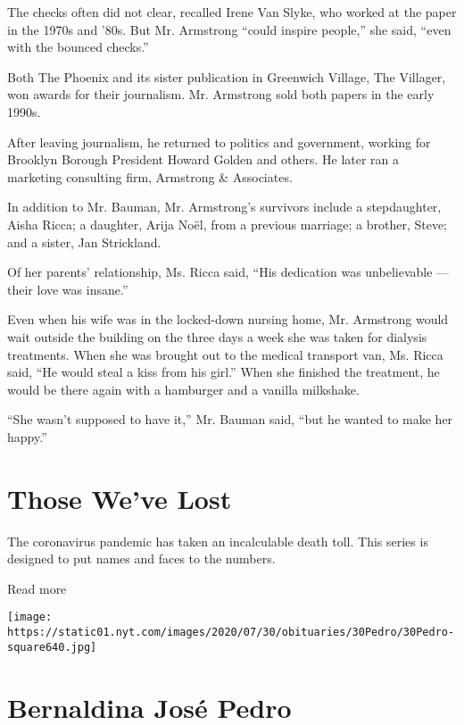 The checks often did not clear, recalled Irene Van Slyke, who worked at
the paper in the 1970s and '80s. But Mr. Armstrong ``could inspire
people,'' she said, ``even with the bounced checks.''

Both The Phoenix and its sister publication in Greenwich Village, The
Villager, won awards for their journalism. Mr. Armstrong sold both
papers in the early 1990s.

After leaving journalism, he returned to politics and government,
working for Brooklyn Borough President Howard Golden and others. He
later ran a marketing consulting firm, Armstrong \& Associates.

In addition to Mr. Bauman, Mr. Armstrong's survivors include a
stepdaughter, Aisha Ricca; a daughter, Arija Noël, from a previous
marriage; a brother, Steve; and a sister, Jan Strickland.

Of her parents' relationship, Ms. Ricca said, ``His dedication was
unbelievable --- their love was insane.''

Even when his wife was in the locked-down nursing home, Mr. Armstrong
would wait outside the building on the three days a week she was taken
for dialysis treatments. When she was brought out to the medical
transport van, Ms. Ricca said, ``He would steal a kiss from his girl.''
When she finished the treatment, he would be there again with a
hamburger and a vanilla milkshake.

``She wasn't supposed to have it,'' Mr. Bauman said, ``but he wanted to
make her happy.''

\href{https://www.nytimes.com/interactive/2020/obituaries/people-died-coronavirus-obituaries.html?action=click\&pgtype=Article\&state=default\&region=BELOW_MAIN_CONTENT\&context=covid_obits_promo}{}

\hypertarget{those-weve-lost}{%
\section{Those We've Lost}\label{those-weve-lost}}

The coronavirus pandemic has taken an incalculable death toll. This
series is designed to put names and faces to the numbers.

Read more

\texttt{[image: https://static01.nyt.com/images/2020/07/30/obituaries/30Pedro/30Pedro-square640.jpg]}

\hypertarget{bernaldina-josuxe9-pedro}{%
\section{Bernaldina José Pedro}\label{bernaldina-josuxe9-pedro}}

